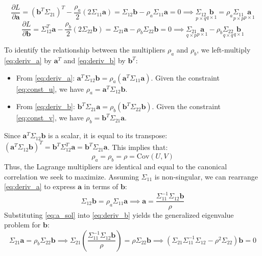 \begin{equation} \label{eq:deriv_a}
    \frac{\partial L}{\partial \mathbf{a}} = (\mathbf{b}^T\Sigma_{21})^T - \frac{\rho_a}{2} (2 \Sigma_{11} \mathbf{a}) = \Sigma_{12} \mathbf{b} - \rho_a \Sigma_{11} \mathbf{a} = 0 \implies \underset{p \times q}{\Sigma_{12}} \underset{q \times 1}{\mathbf{b}} = \rho_a \underset{p \times p}{\Sigma_{11}} \underset{p \times 1}{\mathbf{a}}
\end{equation}
\begin{equation} \label{eq:deriv_b}
    \frac{\partial L}{\partial \mathbf{b}} = \Sigma_{12}^T \mathbf{a} - \frac{\rho_b}{2} (2 \Sigma_{22} \mathbf{b}) = \Sigma_{21} \mathbf{a} - \rho_b \Sigma_{22} \mathbf{b} = 0 \implies \underset{q \times p}{\Sigma_{21}} \underset{p \times 1}{\mathbf{a}} - \rho_b \underset{q \times q}{\Sigma_{22}} \underset{q \times 1}{\mathbf{b}}
\end{equation}




To identify the relationship between the multipliers $\rho_a$ and $\rho_b$, we left-multiply \eqref{eq:deriv_a} by $\mathbf{a}^T$ and \eqref{eq:deriv_b} by $\mathbf{b}^T$:
\begin{itemize}
    \item From \eqref{eq:deriv_a}: $\mathbf{a}^T \Sigma_{12} \mathbf{b} = \rho_a (\mathbf{a}^T \Sigma_{11} \mathbf{a})$. Given the constraint \eqref{eq:const_u}, we have $\rho_a = \mathbf{a}^T \Sigma_{12} \mathbf{b}$.
    \item From \eqref{eq:deriv_b}: $\mathbf{b}^T \Sigma_{21} \mathbf{a} = \rho_b (\mathbf{b}^T \Sigma_{22} \mathbf{b})$. Given the constraint \eqref{eq:const_v}, we have $\rho_b = \mathbf{b}^T \Sigma_{21} \mathbf{a}$.
\end{itemize}
Since $\mathbf{a}^T \Sigma_{12} \mathbf{b}$ is a scalar, it is equal to its transpose: $(\mathbf{a}^T \Sigma_{12} \mathbf{b})^T = \mathbf{b}^T \Sigma_{12}^T \mathbf{a} = \mathbf{b}^T \Sigma_{21} \mathbf{a}$. This implies that:
\begin{equation} \label{eq:rho_equality}
    \rho_a = \rho_b = \rho = \text{Cov}(U, V)
\end{equation}
Thus, the Lagrange multipliers are identical and equal to the canonical correlation we seek to maximize. Assuming $\Sigma_{11}$ is non-singular, we can rearrange \eqref{eq:deriv_a} to express $\mathbf{a}$ in terms of $\mathbf{b}$:
\begin{equation} \label{eq:a_sol}
\Sigma_{12} \mathbf{b} = \rho_a \Sigma_{11} \mathbf{a} \implies \mathbf{a} = \frac{\Sigma_{11}^{-1} \Sigma_{12} \mathbf{b}}{\rho}
\end{equation}
Substituting \eqref{eq:a_sol} into \eqref{eq:deriv_b} yields the generalized eigenvalue problem for $\mathbf{b}$:
\begin{equation} \label{eq:gen_eig_b}
     \Sigma_{21} \mathbf{a} = \rho_b \Sigma_{22} \mathbf{b} \implies \Sigma_{21} \left( \frac{\Sigma_{11}^{-1} \Sigma_{12} \mathbf{b}}{\rho} \right) = \rho \Sigma_{22} \mathbf{b} \implies (\Sigma_{21} \Sigma_{11}^{-1} \Sigma_{12} - \rho^2 \Sigma_{22})\mathbf{b} = 0
\end{equation}

